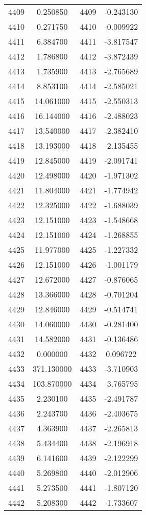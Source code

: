 \documentclass[12pt]{article}
\begin{document}
\begin{longtable}{@{}cccc@{}}
4409 & 0.250850 & 4409 & -0.243130 \\
4410 & 0.271750 & 4410 & -0.009922 \\
4411 & 6.384700 & 4411 & -3.817547 \\
4412 & 1.786800 & 4412 & -3.872439 \\
4413 & 1.735900 & 4413 & -2.765689 \\
4414 & 8.853100 & 4414 & -2.585021 \\
4415 & 14.061000 & 4415 & -2.550313 \\
4416 & 16.144000 & 4416 & -2.488023 \\
4417 & 13.540000 & 4417 & -2.382410 \\
4418 & 13.193000 & 4418 & -2.135455 \\
4419 & 12.845000 & 4419 & -2.091741 \\
4420 & 12.498000 & 4420 & -1.971302 \\
4421 & 11.804000 & 4421 & -1.774942 \\
4422 & 12.325000 & 4422 & -1.688039 \\
4423 & 12.151000 & 4423 & -1.548668 \\
4424 & 12.151000 & 4424 & -1.268855 \\
4425 & 11.977000 & 4425 & -1.227332 \\
4426 & 12.151000 & 4426 & -1.001179 \\
4427 & 12.672000 & 4427 & -0.876065 \\
4428 & 13.366000 & 4428 & -0.701204 \\
4429 & 12.846000 & 4429 & -0.514741 \\
4430 & 14.060000 & 4430 & -0.281400 \\
4431 & 14.582000 & 4431 & -0.136486 \\
4432 & 0.000000 & 4432 & 0.096722 \\
4433 & 371.130000 & 4433 & -3.710903 \\
4434 & 103.870000 & 4434 & -3.765795 \\
4435 & 2.230100 & 4435 & -2.491787 \\
4436 & 2.243700 & 4436 & -2.403675 \\
4437 & 4.363900 & 4437 & -2.265813 \\
4438 & 5.434400 & 4438 & -2.196918 \\
4439 & 6.141600 & 4439 & -2.122299 \\
4440 & 5.269800 & 4440 & -2.012906 \\
4441 & 5.273500 & 4441 & -1.807120 \\
4442 & 5.208300 & 4442 & -1.733607 \\

\end{longtable}
\end{document}
